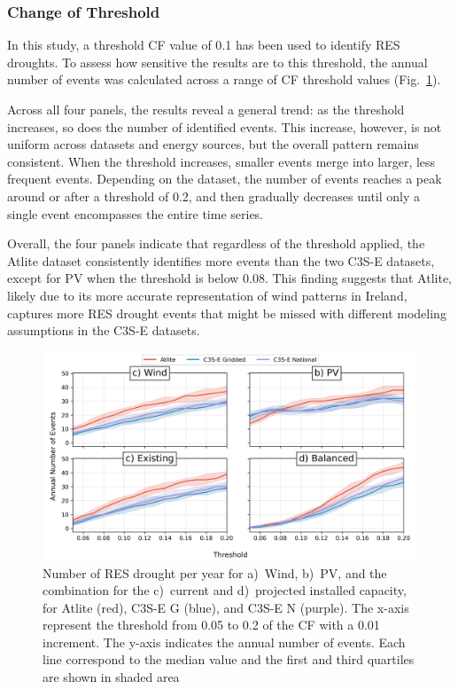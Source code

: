 \documentclass[a4paper, 11pt]{article}
\begin{document}
\newpage
\subsubsection{Change of Threshold}

In this study, a threshold CF value of 0.1 has been used to identify RES droughts. To assess how sensitive the results are to this threshold, the annual number of events was calculated across a range of CF threshold values (Fig.~\ref{fig:number_days_threshold}).

Across all four panels, the results reveal a general trend: as the threshold increases, so does the number of identified events. This increase, however, is not uniform across datasets and energy sources, but the overall pattern remains consistent. When the threshold increases, smaller events merge into larger, less frequent events. Depending on the dataset, the number of events reaches a peak around or after a threshold of 0.2, and then gradually decreases until only a single event encompasses the entire time series.

Overall, the four panels indicate that regardless of the threshold applied, the Atlite dataset consistently identifies more events than the two C3S-E datasets, except for PV when the threshold is below 0.08. This finding suggests that Atlite, likely due to its more accurate representation of wind patterns in Ireland, captures more RES drought events that might be missed with different modeling assumptions in the C3S-E datasets.

\begin{figure}[!ht]
	\centering
	\includegraphics[width=\textwidth]{drouhgts_varying_threshold}
	\caption{Number of RES drought per year for a)~Wind, b)~PV, and the combination for the c)~current and d)~projected installed capacity, for Atlite (red), C3S-E G (blue), and C3S-E N (purple). The x-axis represent the threshold from 0.05 to 0.2 of the CF with a 0.01 increment. The y-axis indicates the annual number of events. Each line correspond to the median value and the first and third quartiles are shown in shaded area}
	\label{fig:number_days_threshold}
\end{figure}
\end{document}
